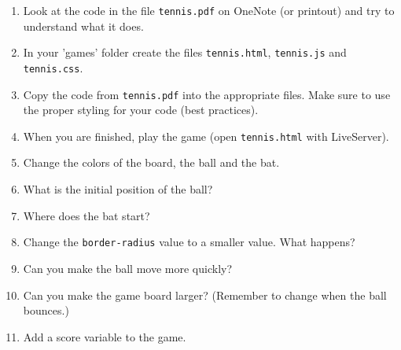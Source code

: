 \documentclass[11pt,a4paper]{report}
\begin{document}
\begin{ex}
\begin{enumerate}
\item Look at the code in the file \verb|tennis.pdf| on OneNote (or printout) and try to understand what it does.
\item In your 'games' folder create the files \verb|tennis.html|, \verb|tennis.js| and \verb|tennis.css|.
\item Copy the code from \verb|tennis.pdf| into the appropriate files. Make sure to use  the proper styling for your code (best practices). 
\item When you are finished, play the game (open \verb|tennis.html| with LiveServer).
\item Change the colors of the board, the ball and the bat.
\item What is the initial position of the ball?
\item Where does the bat start?
\item Change the \verb|border-radius| value to a smaller value. What happens?
\item Can you make the ball move more quickly?
\item Can you make the game board larger? (Remember to change when the ball bounces.)
\item Add a score variable to the game. 
\end{enumerate}
\end{ex}
\end{document}
